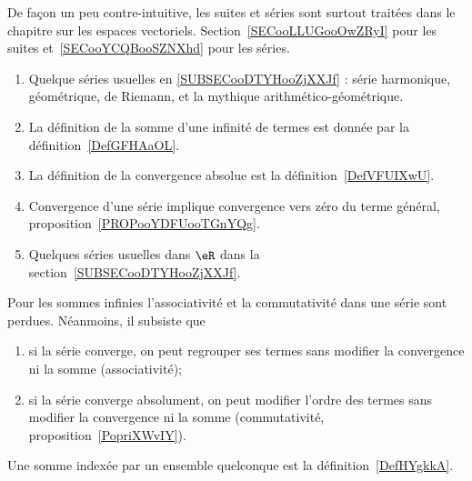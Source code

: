 
De façon un peu contre-intuitive, les suites et séries sont surtout traitées dans le chapitre sur les espaces vectoriels. Section~\ref{SECooLLUGooOwZRyI} pour les suites et~\ref{SECooYCQBooSZNXhd} pour les séries.

\begin{enumerate}
    \item
        Quelque séries usuelles en \ref{SUBSECooDTYHooZjXXJf} : série harmonique, géométrique, de Riemann, et la mythique arithmético-géométrique.
    \item
        La définition de la somme d'une infinité de termes est donnée par la définition~\ref{DefGFHAaOL}.
    \item
        La définition de la convergence absolue est la définition~\ref{DefVFUIXwU}.
    \item
        Convergence d'une série implique convergence vers zéro du terme général, proposition~\ref{PROPooYDFUooTGnYQg}.
    \item
        Quelques séries usuelles dans \( \eR\) dans la section~\ref{SUBSECooDTYHooZjXXJf}.
\end{enumerate}

    Pour les sommes infinies l'associativité et la commutativité dans une série sont perdues. Néanmoins, il subsiste que
  \begin{enumerate}
  \item
      si la série converge, on peut regrouper ses termes sans modifier la convergence ni la somme (associativité);
  \item
      si la série converge absolument, on peut modifier l'ordre des termes sans modifier la convergence ni la somme (commutativité, proposition~\ref{PopriXWvIY}).
  \end{enumerate}

Une somme indexée par un ensemble quelconque est la définition~\ref{DefHYgkkA}.

